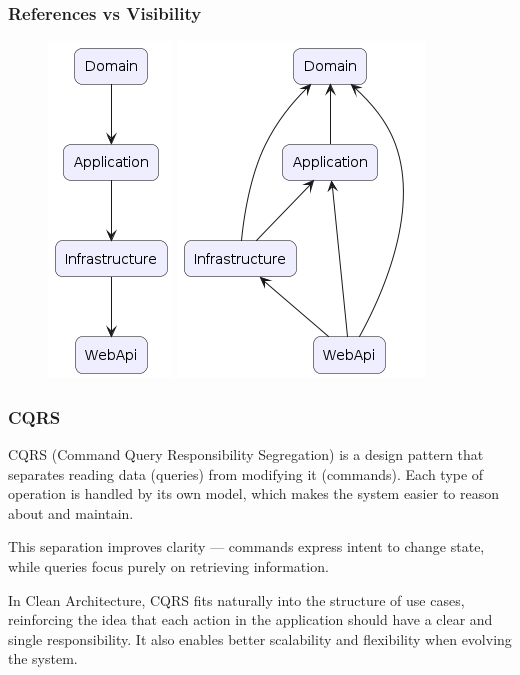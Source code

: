 \documentclass{beamer}
\begin{document}
\begin{frame}
\frametitle{References vs Visibility}
\begin{figure}[h]
    \centering
    \begin{minipage}{0.45\textwidth}
        \centering
        \includegraphics[height=0.75\textheight, keepaspectratio]{references.png}
    \end{minipage}\hfill
    \begin{minipage}{0.45\textwidth}
        \centering
        \includegraphics[height=0.75\textheight, keepaspectratio]{visibility.png}
    \end{minipage}
\end{figure}
\end{frame}

\begin{frame}
\frametitle{CQRS}
CQRS (Command Query Responsibility Segregation) is a design pattern that separates reading data (queries) from modifying it (commands). Each type of operation is handled by its own model, which makes the system easier to reason about and maintain.

This separation improves clarity — commands express intent to change state, while queries focus purely on retrieving information.

In Clean Architecture, CQRS fits naturally into the structure of use cases, reinforcing the idea that each action in the application should have a clear and single responsibility. It also enables better scalability and flexibility when evolving the system.
\end{frame}
\end{document}
